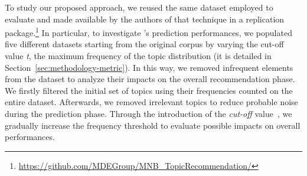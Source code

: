 




To study our proposed approach, we reused the same dataset employed to evaluate 
\MNB and made available by the authors of that technique in a replication 
package.\footnote{\url{https://github.com/MDEGroup/MNB\_TopicRecommendation/}} 
%
%
In particular, to investigate \TF's prediction performances, we populated five 
different datasets starting from the original \MNB corpus by varying the 
cut-off value \emph{t}, \ie the maximum frequency of the topic distribution (it 
is detailed in Section~\ref{sec:methodology-metric}). In this way, we removed 
infrequent elements from the dataset to analyze their impacts on the overall 
recommendation phase. We firstly filtered the initial set of topics using their 
frequencies counted on the entire \GH dataset. Afterwards, we removed 
irrelevant topics to reduce probable noise during the prediction phase. Through 
the introduction of the \emph{cut-off} value~\cite{10.1145/3383219.3383227}, we 
gradually increase the frequency threshold to evaluate possible impacts on 
overall performances. %


